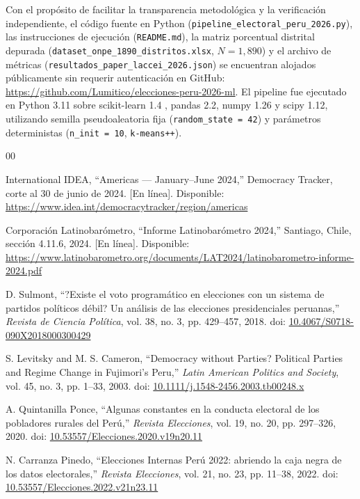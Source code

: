 \documentclass[conference,10pt,letterpaper]{IEEEtran}
\begin{document}
Con el propósito de facilitar la transparencia metodológica y la verificación independiente, el código fuente en Python (\texttt{pipeline\_electoral\_peru\_2026.py}), las instrucciones de ejecución (\texttt{README.md}), la matriz porcentual distrital depurada (\texttt{dataset\_onpe\_1890\_distritos.xlsx}, $N = 1{,}890$) y el archivo de métricas (\texttt{resultados\_paper\_laccei\_2026.json}) se encuentran alojados públicamente sin requerir autenticación en GitHub: \url{https://github.com/Lumitico/elecciones-peru-2026-ml}. El pipeline fue ejecutado en Python 3.11 sobre scikit-learn 1.4 \cite{pedregosa2011}, pandas 2.2, numpy 1.26 y scipy 1.12, utilizando semilla pseudoaleatoria fija (\texttt{random\_state = 42}) y parámetros deterministas (\texttt{n\_init = 10}, \texttt{k-means++}).

\balance
\begin{thebibliography}{00}

 International IDEA, ``Americas --- January--June 2024,'' Democracy Tracker, corte al 30 de junio de 2024. [En línea]. Disponible: \url{https://www.idea.int/democracytracker/region/americas}

 Corporación Latinobarómetro, ``Informe Latinobarómetro 2024,'' Santiago, Chile, sección 4.11.6, 2024. [En línea]. Disponible: \url{https://www.latinobarometro.org/documents/LAT2024/latinobarometro-informe-2024.pdf}

 D. Sulmont, ``?Existe el voto programático en elecciones con un sistema de partidos políticos débil? Un análisis de las elecciones presidenciales peruanas,'' \textit{Revista de Ciencia Política}, vol. 38, no. 3, pp. 429--457, 2018. doi: \href{https://doi.org/10.4067/S0718-090X2018000300429}{10.4067/S0718-090X2018000300429}

 S. Levitsky and M. S. Cameron, ``Democracy without Parties? Political Parties and Regime Change in Fujimori's Peru,'' \textit{Latin American Politics and Society}, vol. 45, no. 3, pp. 1--33, 2003. doi: \href{https://doi.org/10.1111/j.1548-2456.2003.tb00248.x}{10.1111/j.1548-2456.2003.tb00248.x}

 A. Quintanilla Ponce, ``Algunas constantes en la conducta electoral de los pobladores rurales del Perú,'' \textit{Revista Elecciones}, vol. 19, no. 20, pp. 297--326, 2020. doi: \href{https://doi.org/10.53557/Elecciones.2020.v19n20.11}{10.53557/Elecciones.2020.v19n20.11}

 N. Carranza Pinedo, ``Elecciones Internas Perú 2022: abriendo la caja negra de los datos electorales,'' \textit{Revista Elecciones}, vol. 21, no. 23, pp. 11--38, 2022. doi: \href{https://doi.org/10.53557/Elecciones.2022.v21n23.11}{10.53557/Elecciones.2022.v21n23.11}


\end{thebibliography}
\end{document}
